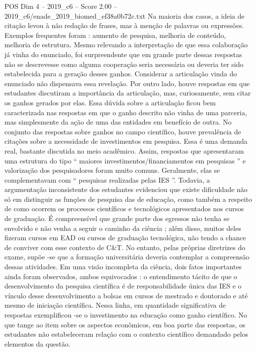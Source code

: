 \begin{textsample}{POS Dim 4 – 2019\_c6 – Score 2.00 – 2019\_c6/enade\_2019\_biomed\_ef38a0b72c.txt}
Na maioria dos casos, a ideia de citação levou à não redação de frases, mas à menção de palavras ou expressões.
Exemplos frequentes foram : aumento de pesquisa, melhoria de conteúdo, melhoria de estrutura.
Mesmo relevando a interpretação de que essa colaboração já vinha do enunciado, foi surpreendente que em grande parte dessas respostas não se descrevesse como alguma cooperação seria necessária ou deveria ter sido estabelecida para a geração desses ganhos.
Considerar a articulação vinda do enunciado não dispensava essa revelação.
Por outro lado, houve respostas em que estudantes discutiram a importância da articulação, mas, curiosamente, sem citar os ganhos gerados por elas.
Essa dúvida sobre a articulação ficou bem caracterizada nas respostas em que o ganho descrito não vinha de uma parceria, mas simplesmente da ação de uma das entidades em benefício de outra.
No conjunto das respostas sobre ganhos no campo científico, houve prevalência de citações sobre a necessidade de investimentos em pesquisa.
Essa é uma demanda real, bastante discutida no meio acadêmico.
Assim, respostas que apresentaram uma estrutura do tipo “ maiores investimentos/financiamentos em pesquisas ” e valorização dos pesquisadores foram muito comuns.
Geralmente, elas se complementavam com “ pesquisas realizadas pelas IES ”.
Todavia, a argumentação inconsistente dos estudantes evidenciou que existe dificuldade não só em distinguir as funções de pesquisa das de educação, como também a respeito de como ocorrem os processos científicos e tecnológicos apresentados nos cursos de graduação.
É compreensível que grande parte dos egressos não tenha se envolvido e não venha a seguir o caminho da ciência ; além disso, muitos deles fizeram cursos em EAD ou cursos de graduação tecnológica, não tendo a chance de conviver com esse contexto de C\&T.
No entanto, pelas próprias diretrizes do exame, supõe -se que a formação universitária deveria contemplar a compreensão dessas atividades.
Em uma visão incompleta da ciência, dois fatos importantes ainda foram observados, ambos equivocados : o entendimento tácito de que o desenvolvimento da pesquisa científica é de responsabilidade única das IES e o vínculo desse desenvolvimento a bolsas em cursos de mestrado e doutorado e até mesmo de iniciação científica.
Nessa linha, em quantidade significativa de respostas exemplificou -se o investimento na educação como ganho científico.
No que tange ao item sobre os aspectos econômicos, em boa parte das respostas, os estudantes não estabeleceram relação com o contexto científico demandado pelos elementos da questão.

\end{textsample}
